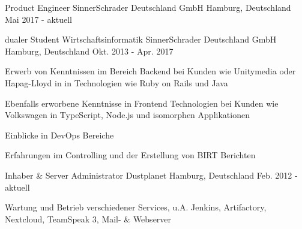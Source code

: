 

\begin{cventries}

  \cventry
    {Product Engineer} %
    {SinnerSchrader Deutschland GmbH} %
    {Hamburg, Deutschland} %
    {Mai 2017 - aktuell} %
    {
    }

  \cventry
    {dualer Student Wirtschaftsinformatik} %
    {SinnerSchrader Deutschland GmbH} %
    {Hamburg, Deutschland} %
    {Okt. 2013 - Apr. 2017} %
    {
      \begin{cvitems} %
        \item {Erwerb von Kenntnissen im Bereich Backend bei Kunden wie Unitymedia oder Hapag-Lloyd in in Technologien wie Ruby on Rails und Java}
        \item {Ebenfalls erworbene Kenntnisse in Frontend Technologien bei Kunden wie Volkswagen in TypeScript, Node.js und isomorphen Applikationen}
        \item {Einblicke in DevOps Bereiche}
        \item {Erfahrungen im Controlling und der Erstellung von BIRT Berichten}
      \end{cvitems}
    }

  \cventry
    {Inhaber \& Server Administrator} %
    {Dustplanet} %
    {Hamburg, Deutschland} %
    {Feb. 2012 - aktuell} %
    {
      \begin{cvitems} %
      	\item {Wartung und Betrieb verschiedener Services, u.A. Jenkins, Artifactory, Nextcloud, TeamSpeak 3, Mail- \& Webserver}
      \end{cvitems}
    }

\end{cventries}
